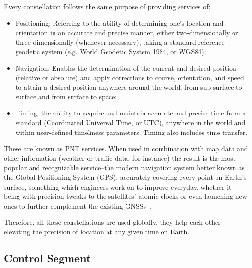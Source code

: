 Every constellation follows the same purpose of providing services of:

\begin{itemize}
    \item Positioning: Referring to the ability of determining one's location and orientation in an accurate and precise manner, either two-dimensionally or three-dimensionally (whenever necessary), taking a standard reference geodetic system (e.g. World Geodetic System 1984, or WGS84);
    \item Navigation: Enables the determination of the current and desired position (relative or absolute) and apply corrections to course, orientation, and speed to attain a desired position anywhere around the world, from sub-surface to surface and from surface to space;
    \item Timing, the ability to acquire and maintain accurate and precise time from a standard (Coordinated Universal Time, or UTC), anywhere in the world and within user-defined timeliness parameters. Timing also includes time transfer.
\end{itemize}
These are known as PNT services.
When used in combination with map data and other information (weather or traffic data, for instance) the result is the most popular and recognizable service--the modern navigation system better known as the Global Positioning System (GPS).
accurately covering every point on Earth's surface, something which engineers work on to improve everyday, whether it being with precision tweaks to the satellites' atomic clocks or even launching new ones to further complement the existing GNSSs~\cite{euspa_news_2022}.

Therefore, all these constellations are used globally, they help each other elevating the precision of location at any given time on Earth.


\subsection{Control Segment}\label{sec:II_gnss_control_seg}

